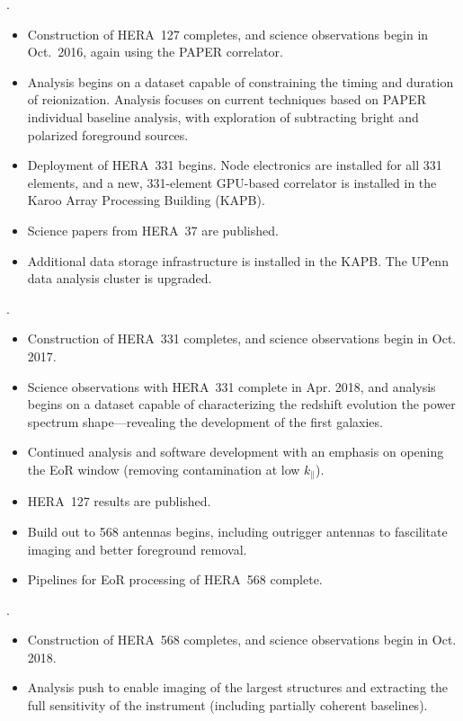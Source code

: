 \documentclass[preprint]{aastex}
\begin{document}
.
\begin{itemize}\setlength{\parskip}{0pt}
\vspace{-7pt}
  \item Construction of HERA~127 completes, and science observations begin in Oct.\ 2016, again using the PAPER correlator.
  \item Analysis begins on a dataset capable of constraining the timing and duration of reionization. Analysis focuses on current techniques based on PAPER individual baseline analysis, with exploration of subtracting bright and polarized foreground sources.
  \item Deployment of HERA~331 begins. Node electronics are installed for all 331 elements, and a new, 331-element GPU-based correlator is installed in the Karoo Array Processing Building (KAPB).
  \item Science papers from HERA~37 are published.
  \item  Additional data storage infrastructure is installed in the
KAPB.  The UPenn data analysis cluster is upgraded. 
\end{itemize}

.
\begin{itemize}
\setlength{\parskip}{0pt}
\vspace{-7pt}
  \item Construction of HERA~331 completes, and science observations begin in Oct. 2017.
  \item Science observations with HERA~331 complete in Apr. 2018, and analysis begins on a dataset capable of
characterizing the redshift evolution the power spectrum shape---revealing the development of the first galaxies.
  \item Continued analysis and software development with an emphasis on opening the EoR window (removing contamination at low $k_{\parallel}$). 
  \item  HERA~127 results are published.
  \item Build out to 568 antennas begins, including outrigger antennas to fascilitate imaging and better foreground removal.
  \item Pipelines for EoR processing of HERA~568 complete.
\end{itemize}

.
\begin{itemize}
\setlength{\parskip}{0pt}
\vspace{-7pt}
  \item Construction of HERA~568 completes, and science observations begin in Oct. 2018.
  \item Analysis push to enable imaging of the largest structures and extracting the full sensitivity of the instrument (including partially coherent baselines). 
\end{itemize}
\end{document}
